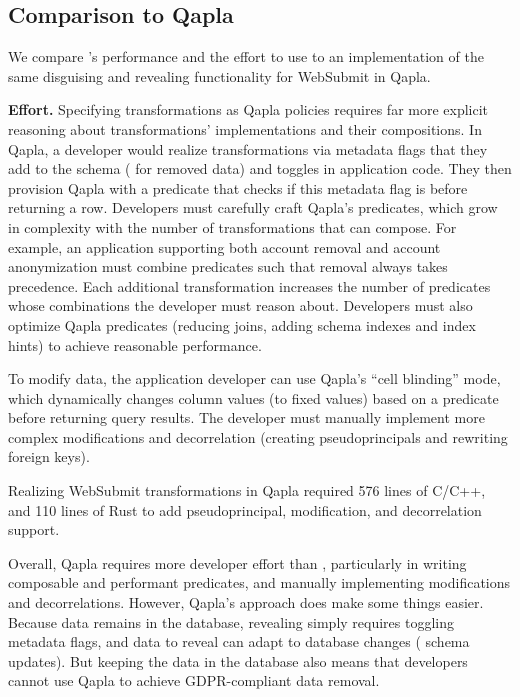 \subsection{Comparison to Qapla}
\label{s:eval-qapla}

We compare \sys's performance and the effort to use \sys to an implementation of
the same disguising and revealing functionality for WebSubmit in Qapla.
%

%
\textbf{Effort.}
%
Specifying \xxing transformations as Qapla policies requires far more
explicit reasoning about transformations' implementations and their
compositions.
%
In Qapla, a developer would realize \xxing transformations via metadata flags
that they add to the schema (\eg {} for removed data) and toggles in
application code. They then provision Qapla with a predicate that checks if
this metadata flag is  before returning a row.
%
Developers must carefully craft Qapla's predicates, which grow in complexity
with the number of \xxing transformations that can compose. For example, an
application supporting both account removal and account anonymization must
combine predicates such that removal always takes precedence. Each additional
transformation increases the number of predicates whose combinations the
developer must reason about.
%
Developers must also optimize Qapla predicates (\eg reducing joins, adding
schema indexes and index hints) to achieve reasonable performance.

%
To modify data, the application developer can use Qapla's ``cell blinding''
mode, which dynamically changes column values (to fixed values) based on a
predicate before returning query results.
%
The developer must manually implement more complex modifications and
decorrelation (\ie creating pseudoprincipals and rewriting foreign keys).
%

%
Realizing WebSubmit transformations in Qapla required 576 lines of C/C++, and
110 lines of Rust to add pseudoprincipal, modification, and decorrelation
support.
%

Overall, Qapla requires more developer effort than \sys, particularly in writing
composable and performant predicates, and manually implementing modifications
and decorrelations. However, Qapla's approach does make some things easier.
%
Because data remains in the database, revealing simply requires toggling
metadata flags, and data to reveal can adapt to database changes (\eg
schema updates). But keeping the data in the database also means that developers cannot use Qapla to
achieve GDPR-compliant data removal. %

